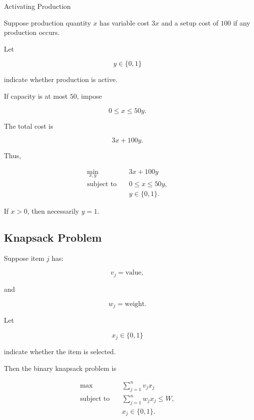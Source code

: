 \begin{workedexamplebox}{Activating Production}

Suppose production quantity \(x\) has variable cost \(3x\) and a setup
cost of \(100\) if any production occurs.

Let

\[
y\in\{0,1\}
\]

indicate whether production is active.

If capacity is at most \(50\), impose

\[
0\leq x\leq50y.
\]

The total cost is

\[
3x+100y.
\]

Thus,

\begin{answerbox}
\[
\boxed{
\begin{aligned}
\min_{x,y}
\quad&
3x+100y
\\
\text{subject to}
\quad&
0\leq x\leq50y,
\\
&
y\in\{0,1\}.
\end{aligned}
}
\]
\end{answerbox}

If \(x>0\), then necessarily \(y=1\).

\end{workedexamplebox}

\subsection{Knapsack Problem}
\label{subsec:integer-knapsack-problem}

Suppose item \(j\) has:

\[
v_j
=
\text{value},
\]

and

\[
w_j
=
\text{weight}.
\]

Let

\[
x_j\in\{0,1\}
\]

indicate whether the item is selected.

Then the binary knapsack problem is

\[
\boxed{
\begin{aligned}
\max
\quad&
\sum_{j=1}^{n}
v_jx_j
\\
\text{subject to}
\quad&
\sum_{j=1}^{n}
w_jx_j
\leq
W,
\\
&
x_j\in\{0,1\}.
\end{aligned}
}
\]

